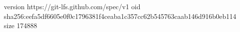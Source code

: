version https://git-lfs.github.com/spec/v1
oid sha256:eefa5df6605e0f0c1796381f4ceaba1c357cc62b545763caab146d916b0eb114
size 174888
